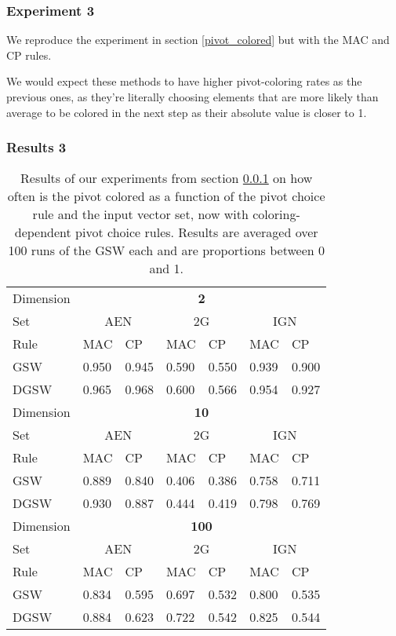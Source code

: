 \documentclass[12pt]{article}
\begin{document}
\subsubsection{Experiment 3}\label{pivot_colored_coloring_rules}
We reproduce the experiment in section \ref{pivot_colored} but with the MAC and CP rules.

We would expect these methods to have higher pivot-coloring rates as the previous ones, as they're literally choosing elements that are more likely than average to be colored in the next step as their absolute value is closer to 1.
\subsubsection{Results 3}
\begin{table}[h!]
\centering
\caption{Results of our experiments from section \ref{pivot_colored_coloring_rules} on how often is the pivot colored as a function of the pivot choice rule and the input vector set, now with coloring-dependent pivot choice rules. Results are averaged over 100 runs of the GSW each and are proportions between 0 and 1.}
\begin{tabular}{l|ll|ll|ll}
Dimension &\multicolumn{6}{c}{\textbf{2}}\\
Set  & \multicolumn{2}{c}{AEN} & \multicolumn{2}{c}{2G} & \multicolumn{2}{c}{IGN} \\
Rule &MAC&CP&MAC&CP&MAC&CP\\ \hline
GSW  &0.950&0.945&0.590&0.550&0.939&0.900\\
DGSW  &0.965&0.968&0.600&0.566&0.954&0.927\\
\hline
\hline
Dimension &\multicolumn{6}{c}{\textbf{10}}\\
Set  & \multicolumn{2}{c}{AEN} & \multicolumn{2}{c}{2G} & \multicolumn{2}{c}{IGN} \\
Rule &MAC&CP&MAC&CP&MAC&CP\\ \hline
GSW  &0.889&0.840&0.406&0.386&0.758&0.711\\
DGSW  &0.930&0.887&0.444&0.419&0.798&0.769\\
\hline
\hline
Dimension &\multicolumn{6}{c}{\textbf{100}}\\
Set  & \multicolumn{2}{c}{AEN} & \multicolumn{2}{c}{2G} & \multicolumn{2}{c}{IGN} \\
Rule &MAC&CP&MAC&CP&MAC&CP\\ \hline
GSW  &0.834&0.595&0.697&0.532&0.800&0.535\\
DGSW  &0.884&0.623&0.722&0.542&0.825&0.544\\
\end{tabular}
\label{pivot_colored_coloring_rules_results}
\end{table}
\end{document}
